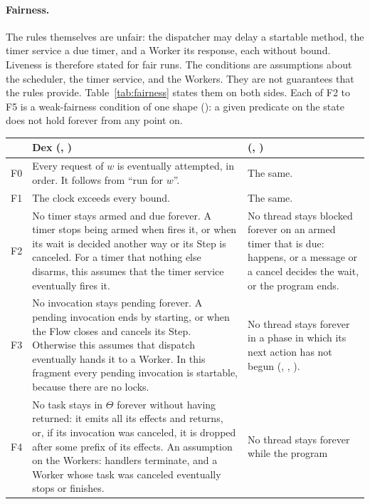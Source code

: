 \paragraph{Fairness.}
The rules themselves are unfair: the dispatcher may delay a startable
method, the timer service a due timer, and a Worker its response, each
without bound. Liveness is therefore stated for fair runs. The conditions
are assumptions about the scheduler, the timer service, and the Workers.
They are not guarantees that the rules provide. Table~\ref{tab:fairness}
states them on both sides. Each of F2 to F5 is a weak-fairness condition of
one shape (): a given predicate on the state does not
hold forever from any point on.

\begin{table}[t]
\centering
\small
\begin{tabularx}{\textwidth}{@{}P{0.6cm}LL@{}}
\toprule
 & Dex (, ) &
   \Lang{} (, ) \\
\midrule
F0 & Every request of $w$ is eventually attempted, in order. It follows
  from ``run for $w$''. & The same. \\
F1 & The clock exceeds every bound. & The same. \\
F2 & No timer stays armed and due forever. A timer stops being armed when
   fires it, or when its wait is decided another way
  or its Step is canceled. For a timer that nothing else disarms, this
  assumes that the timer service eventually fires it. & No thread stays
  blocked forever on an armed timer that is due:  happens, or a
  message or a cancel decides the wait, or the program ends. \\
F3 & No invocation stays pending forever. A pending invocation ends by
  starting, or when the Flow closes and cancels its Step. Otherwise this
  assumes that dispatch eventually hands it to a Worker. In this fragment
  every pending invocation is startable, because there are no locks. & No
  thread
  stays forever in a phase in which its next action has not begun
  (, , ). \\
F4 & No task stays in $\Theta$ forever without having returned: it emits
  all its effects and returns, or, if its invocation was canceled, it is
  dropped after some prefix of its effects. An assumption on the Workers:
  handlers terminate, and a Worker whose task was canceled eventually stops
  or finishes. & No thread stays  forever while the program

\end{tabularx}
\end{table}
